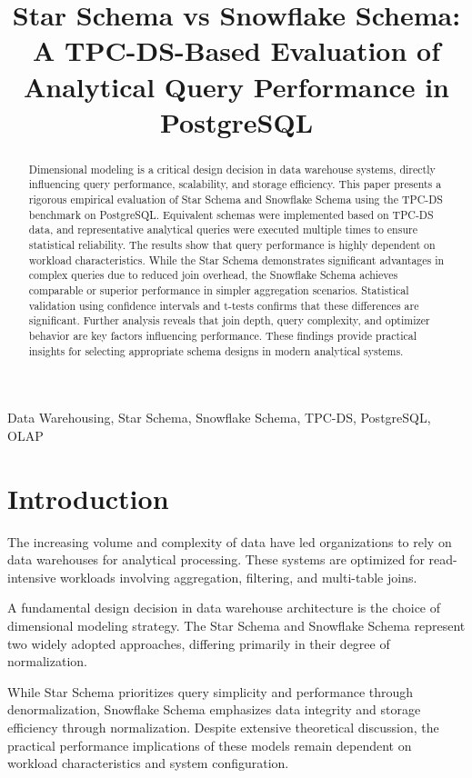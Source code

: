 \documentclass[conference]{IEEEtran}
\title{Star Schema vs Snowflake Schema: A TPC-DS-Based Evaluation of Analytical Query Performance in PostgreSQL}
\author{
\IEEEauthorblockN{Daniel Correia, Jose Fonseca, Marcelo Andrade, Miguel Silva}
\IEEEauthorblockA{Advanced Exploration and Analysis of Databases\\
Instituto Polit\'ecnico de Viseu, Portugal\\}}
\begin{document}
\maketitle

\begin{abstract}
Dimensional modeling is a critical design decision in data warehouse systems, directly influencing query performance, scalability, and storage efficiency. This paper presents a rigorous empirical evaluation of Star Schema and Snowflake Schema using the TPC-DS benchmark on PostgreSQL. Equivalent schemas were implemented based on TPC-DS data, and representative analytical queries were executed multiple times to ensure statistical reliability. The results show that query performance is highly dependent on workload characteristics. While the Star Schema demonstrates significant advantages in complex queries due to reduced join overhead, the Snowflake Schema achieves comparable or superior performance in simpler aggregation scenarios. Statistical validation using confidence intervals and t-tests confirms that these differences are significant. Further analysis reveals that join depth, query complexity, and optimizer behavior are key factors influencing performance. These findings provide practical insights for selecting appropriate schema designs in modern analytical systems.
\end{abstract}

\begin{IEEEkeywords}
Data Warehousing, Star Schema, Snowflake Schema, TPC-DS, PostgreSQL, OLAP
\end{IEEEkeywords}

\section{Introduction}

The increasing volume and complexity of data have led organizations to rely on data warehouses for analytical processing. These systems are optimized for read-intensive workloads involving aggregation, filtering, and multi-table joins.

A fundamental design decision in data warehouse architecture is the choice of dimensional modeling strategy. The Star Schema and Snowflake Schema represent two widely adopted approaches, differing primarily in their degree of normalization.

While Star Schema prioritizes query simplicity and performance through denormalization, Snowflake Schema emphasizes data integrity and storage efficiency through normalization. Despite extensive theoretical discussion, the practical performance implications of these models remain dependent on workload characteristics and system configuration.
\end{document}
